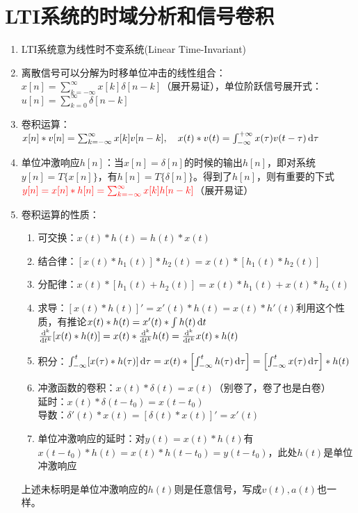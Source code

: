 \documentclass{article}
\begin{document}
\section{LTI系统的时域分析和信号卷积}
\begin{enumerate}[label=(\arabic*)]
	\item LTI系统意为线性时不变系统(Linear Time-Invariant)
	\item 离散信号可以分解为时移单位冲击的线性组合：$x[n]=\sum_{k=-\infty}^{\infty}x[k]\delta[n-k]$（展开易证），单位阶跃信号展开式：$u[n]=\sum_{k=0}^{\infty}\delta[n-k]$
	\item 卷积运算：$x[n]*v[n]=\sum_{k=-\infty}^{\infty}x[k]v[n-k],\quad x(t)*v(t)=\int_{-\infty}^{+\infty}x(\tau)v(t-\tau)\mathop{}\!\mathrm{d} \tau$
	\item 单位冲激响应$h[n]$：当$x[n]=\delta[n]$的时候的输出$h[n]$，即对系统$y[n]=T\{x[n]\}$，有$h[n]=T\{\delta[n]\}$。得到了$h[n]$，则有重要的下式\\
				$\color{red} y[n]=x[n]*h[n]=\sum_{k=-\infty}^{\infty}x[k]h[n-k]$（展开易证）
	\item 卷积运算的性质：
				\begin{enumerate}[label=(\roman*)]
					\item 可交换：$x(t)*h(t)=h(t)*x(t)$
					\item 结合律：$[x(t)*h_1(t)]*h_2(t)=x(t)*[h_1(t)*h_2(t)]$
					\item 分配律：$x(t)*[h_1(t)+h_2(t)]=x(t)*h_1(t)+x(t)*h_2(t)$
					\item 求导：$[x(t)*h(t)]'=x'(t)*h(t)=x(t)*h'(t)$利用这个性质，有推论$x(t)*h(t)=x'(t)*\int h(t)\mathop{}\!\mathrm{d} t$\\
								$\frac{\mathop{}\!\mathrm{d}^k}{\mathop{}\!\mathrm{d} t^k}[x(t)*h(t)]=x(t)*\frac{\mathop{}\!\mathrm{d}^k}{\mathop{}\!\mathrm{d} t^k}h(t)=\frac{\mathop{}\!\mathrm{d}^k}{\mathop{}\!\mathrm{d} t^k}x(t)*h(t)$
					\item 积分：$\int_{-\infty}^{t}[x(\tau)*h(\tau)]\mathop{}\!\mathrm{d}\tau=x(t)*\left[\int_{-\infty}^{t}h(\tau)\mathop{}\!\mathrm{d}\tau\right]=\left[\int_{-\infty}^{t}x(\tau)\mathop{}\!\mathrm{d}\tau\right]*h(t)$
					\item 冲激函数的卷积：$x(t)*\delta(t)=x(t)$（{\red 别卷了，卷了也是白卷}）\\
								延时：$x(t)*\delta(t-t_0)=x(t-t_0)$\\
								导数：$\delta'(t)*x(t) = [\delta(t)*x(t)]' = x'(t)$
					\item 单位冲激响应的延时：对$y(t)=x(t)*h(t)$有$x(t-t_0)*h(t)=x(t)*h(t-t_0)=y(t-t_0)$，此处$h(t)$是单位冲激响应
				\end{enumerate}
				\begin{remark}
					上述未标明是单位冲激响应的$h(t)$则是任意信号，写成$v(t),a(t)$也一样。

\end{remark}
\end{enumerate}
\end{document}
